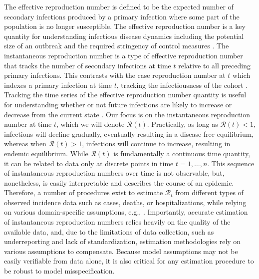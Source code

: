 \documentclass[10pt,letterpaper]{article}
\def\calR{\mathcal{R}}
\begin{document}
The effective reproduction number is defined to be the expected number of
secondary infections produced by a primary infection where some part of the
population is no longer susceptible. The effective reproduction number is a key
quantity for understanding infectious disease dynamics including the potential
size of an outbreak and the required stringency of control measures
\cite{nishiura2009effective,fraser2007estimating}. The instantaneous
reproduction number is a type of effective reproduction number that tracks the
number of secondary infections at time $t$ relative to all preceding primary
infections. This contrasts with the case reproduction number at $t$ which
indexes a primary infection at time $t$, tracking the infectiousness of the
cohort \cite{gostic2020practical}. Tracking the time series of the effective
reproduction number quantity is useful for understanding whether or not future
infections are likely to increase or decrease from the current state
\cite{anderson1991infectious}. Our focus is on the instantaneous reproduction
number at time $t$, which we will denote $\calR(t)$. Practically, as long as
$\calR(t) < 1$, infections will decline gradually, eventually resulting in a
disease-free equilibrium, whereas when $\calR(t) > 1$, infections will continue
to increase, resulting in endemic equilibrium. While $\calR(t)$ is fundamentally
a continuous time quantity, it can be related to data only at discrete points in
time $t = 1,\ldots,n$. This sequence of instantaneous reproduction numbers over
time is not observable, but, nonetheless, is easily interpretable and describes
the course of an epidemic. Therefore, a number of procedures exist to estimate
$\calR_t$ from different types of observed incidence data such as cases, deaths,
or hospitalizations, while relying on various domain-specific assumptions, e.g.,
\cite{wallinga2004different,hao2020reconstruction,goldstein2023semiparametric,goldstein2024incorporating}.
Importantly, accurate estimation of instantaneous reproduction numbers relies
heavily on the quality of the available data, and, due to the limitations of
data collection, such as underreporting and lack of standardization, estimation
methodologies rely on various assumptions to compensate. Because model
assumptions may not be easily verifiable from data alone, it is also critical
for any estimation procedure to be robust to model misspecification. 
\end{document}
